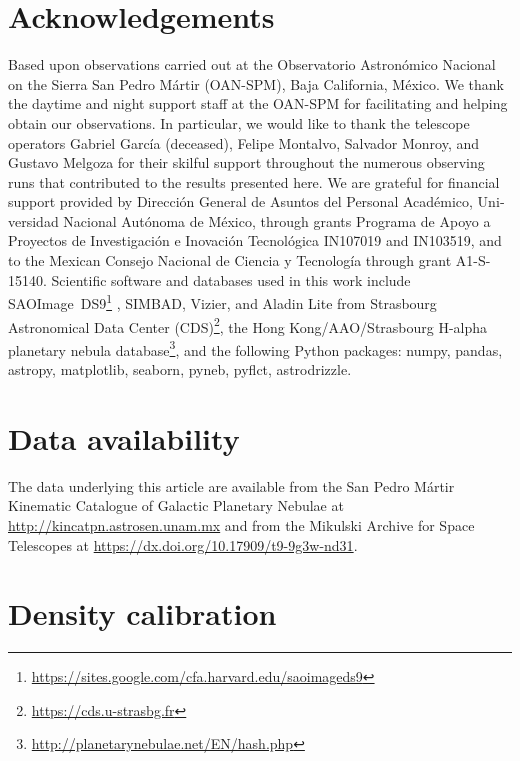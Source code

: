 \documentclass[useAMS, usenatbib]{mnras}
\begin{document}
\section*{Acknowledgements}
Based upon observations carried out at the Observatorio Astronómico Nacional on the Sierra San Pedro Mártir (OAN-SPM), Baja California, México. 
We thank the daytime and night support staff at the OAN-SPM for facilitating and helping obtain our observations.
In particular, we would like to thank the telescope operators
Gabriel García (deceased), Felipe Montalvo, Salvador Monroy, and Gustavo Melgoza
for their skilful support throughout the numerous observing runs that contributed to the results presented here.
We are grateful for financial support provided by
\foreignlanguage{spanish}{
  Dirección General de Asuntos del Personal Académico,
  Universidad Nacional Autónoma de México},
through grants
\foreignlanguage{spanish}{
  Programa de Apoyo a Proyectos de Investigación
  e Inovación Tecnológica}
IN107019 and IN103519,
and to the Mexican
\foreignlanguage{spanish}{
  Consejo Nacional de Ciencia y Tecnología}
through grant A1-S-15140.
Scientific software and databases used in this work include
SAOImage~DS9\footnote{\url{https://sites.google.com/cfa.harvard.edu/saoimageds9}} \citep{Joye:2003a},
SIMBAD, Vizier, and Aladin Lite from Strasbourg Astronomical Data Center (CDS)\footnote{\url{https://cds.u-strasbg.fr}},
the Hong Kong/AAO/Strasbourg H-alpha planetary nebula database\footnote{\url{http://planetarynebulae.net/EN/hash.php}},
and the following Python packages:
numpy, pandas, astropy, matplotlib, seaborn, pyneb, pyflct, astrodrizzle.


\section*{Data availability}
\label{sec:data-availability}

The data underlying this article are available from the
\foreignlanguage{spanish}{San Pedro Mártir} Kinematic Catalogue of Galactic Planetary Nebulae
at \url{http://kincatpn.astrosen.unam.mx}
and from the Mikulski Archive for Space Telescopes
at \url{https://dx.doi.org/10.17909/t9-9g3w-nd31}.


\appendix

\section{Density calibration}
\label{sec:density-calibration}
\end{document}
